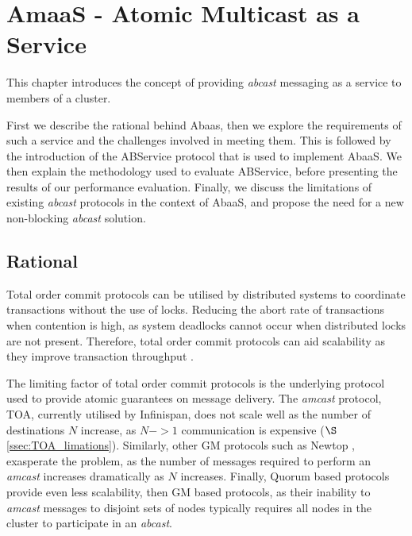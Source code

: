 \chapter{AmaaS - Atomic Multicast as a Service}

    \graphicspath{{Chapter3-TxService/Figs/Vector/}{Chapter3-TxService/Figs/}}

This chapter introduces the concept of providing \emph{abcast} messaging as a service to members of a cluster.

First we describe the rational behind \textsf{Abaas}, then we explore the requirements of such a service and the challenges involved in meeting them.  This is followed by the introduction of the \textsf{ABService} protocol that is used to implement \textsf{AbaaS}.  We then explain the methodology used to evaluate \textsf{ABService}, before presenting the results of our performance evaluation.  Finally, we discuss the limitations of existing \emph{abcast} protocols in the context of \textsf{AbaaS}, and propose the need for a new non-blocking \emph{abcast} solution.  

\section{Rational}
Total order commit protocols can be utilised by distributed systems to coordinate transactions without the use of locks.  Reducing the abort rate of transactions when contention is high, as system deadlocks cannot occur when distributed locks are not present.  Therefore, total order commit protocols can aid scalability as they improve transaction throughput \citep{Ruivo:2011:ETO:2120967.2121604}.  

The limiting factor of total order commit protocols is the underlying protocol used to provide atomic guarantees on message delivery.  The \emph{amcast} protocol, TOA, currently utilised by Infinispan, does not scale well as the number of destinations $N$ increase, as $N->1$ communication is expensive ($\S$ \ref{ssec:TOA_limations}).  Similarly, other GM protocols such as Newtop \citep{Ezhilchelvan:1995:NFG:876885.880005}, exasperate the problem, as the number of messages required to perform an \emph{amcast} increases dramatically as $N$ increases.  Finally, Quorum based protocols provide even less scalability, then GM based protocols, as their inability to \emph{amcast} messages to disjoint sets of nodes typically requires all nodes in the cluster to participate in an \emph{abcast}.  

